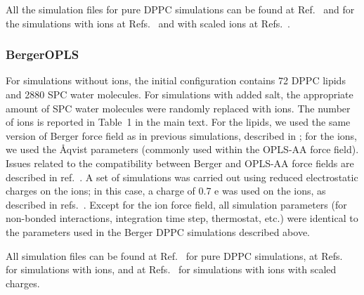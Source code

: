 \documentclass[twoside,twocolumn,9pt]{article}
\begin{document}
All the simulation files for pure DPPC simulations can be found at Ref.~ and for the simulations with ions 
at Refs.~ 
and with scaled ions at Refs.~.



\subsubsection{BergerOPLS}
For simulations without ions, the initial configuration contains 72 DPPC lipids and 2880 SPC water molecules. For simulations with added salt, the appropriate amount of SPC water molecules were randomly replaced with ions. The number of ions is reported in Table~1 in the main text.
For the lipids, we used the same version of Berger force field as in previous simulations, described in \cite{berger97}; for the ions, we used the \r{A}qvist parameters \cite{aqvist90} (commonly used within the OPLS-AA force field). Issues related to the compatibility between Berger and OPLS-AA force fields are described in ref.~\cite{tieleman06}. 
A set of simulations was carried out using reduced electrostatic charges on the ions; in this case, a charge of 0.7 e was used on the ions, as described in refs.~\cite{kohagen16, leontyev11}. Except for the ion force field, all simulation parameters (for non-bonded interactions, integration time step, thermostat, etc.) were identical to the parameters used in the Berger DPPC simulations described above.

All simulation files can be found at Ref.~ for pure DPPC simulations, 
at Refs.~ for simulations with ions,
and at Refs.~ for simulations with ions with scaled charges. 
\end{document}
